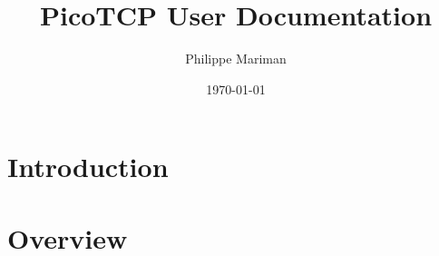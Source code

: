 %






\usepackage{hyperref}
\usepackage{longtable}

\usepackage{draftwatermark}

\usepackage[compact]{titlesec}

\usepackage{enumitem}




\title{PicoTCP User Documentation}
\author{Philippe Mariman}
\date{\today}
\maketitle

\thispagestyle{empty}



\tableofcontents

\chapter{Introduction}
\label{chap:intro}
%

\chapter{Overview}
\label{chap:overview}
%


